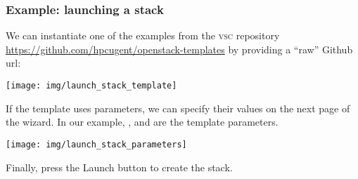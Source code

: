 \subsubsection{Example: launching a stack}
We can instantiate one of the examples from the \textsc{vsc}
repository \url{https://github.com/hpcugent/openstack-templates} by
providing a ``raw'' Github url:
\begin{center}
  \texttt{[image: img/launch\_stack\_template]}
\end{center}
If the template uses parameters, we can specify their values on the
next page of the wizard.  In our example, ,
 and  are the template
parameters.
\begin{center}
  \texttt{[image: img/launch\_stack\_parameters]}
\end{center}
Finally, press the Launch button to create the stack.

